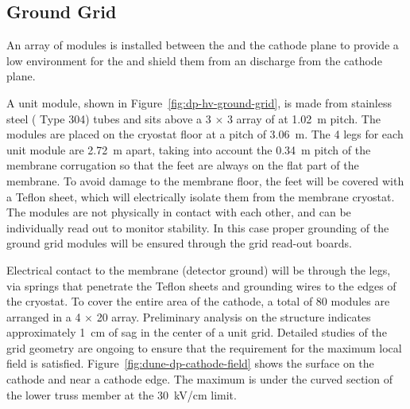 \subsection{Ground Grid}
\label{sec:dp-hv-groundgrid}

An array of  modules  
is installed between the  and the cathode plane to provide a low \efield environment for the  and shield them from an   discharge from the cathode plane.

A  unit module, shown in Figure~\ref{fig:dp-hv-ground-grid}, is made from  stainless steel ( Type 304) tubes 
and %
sits above a \num{3} $\times$ \num{3} array of  at \SI{1.02}{\m} pitch. The  modules are placed on the cryostat floor at a pitch of \SI{3.06}{\m}. The \num{4} legs for each  unit module are \SI{2.72}{\m} apart, taking into account the \SI{0.34}{\m} pitch of the membrane corrugation so that the feet are always on the flat part of the membrane. To avoid damage to the membrane floor, the feet will be covered with a Teflon\texttrademark{} %
sheet, which will %
electrically isolate them from the membrane cryostat.  The modules are not physically in contact with each other, %
and can be individually read out to monitor  stability. In this case proper grounding of the ground grid modules will be ensured through the grid read-out boards. 


Electrical contact to the membrane (detector ground) will be through the legs, via springs that penetrate the Teflon sheets %
and grounding wires  to the edges of the cryostat. To cover the entire area of the cathode, a total of \num{80}  modules are arranged in %
a \num{4} $\times$ \num{20} array. Preliminary analysis on the  structure %
indicates approximately \SI{1}{\cm} of sag in the center of %
a unit grid. Detailed studies of the grid geometry are ongoing to ensure that the requirement for the maximum local field is satisfied. Figure~\ref{fig:dune-dp-cathode-field} shows the surface \efield on the cathode and  near a  cathode edge.  The maximum \efield is under the curved section of the lower truss member at the \SI{30}{\kV/\cm} limit.

